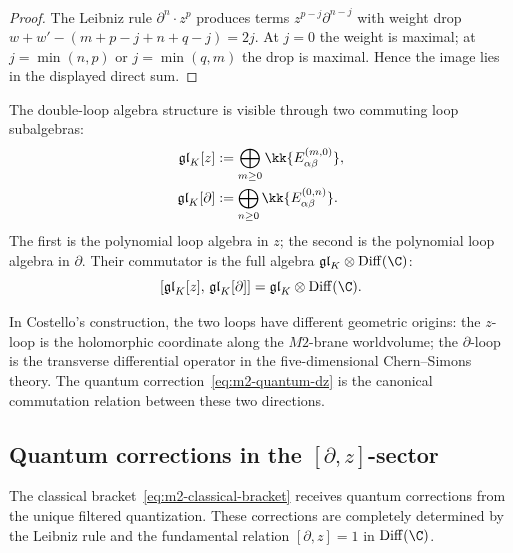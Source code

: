 \begin{proof}
The Leibniz rule $\partial^n\cdot z^p$
produces terms $z^{p-j}\partial^{n-j}$ with weight drop
$w+w'-(m+p-j+n+q-j)=2j$. At $j=0$ the weight is maximal;
at $j=\min(n,p)$ or $j=\min(q,m)$ the drop is maximal.
Hence the image lies in the displayed direct sum.
\end{proof}

\begin{definition}
The double-loop algebra structure is visible through two commuting
loop subalgebras:
\begin{align}
\mathfrak{gl}_K[z]
&:= \bigoplus_{m\ge 0}
\kk\{E^{(m,0)}_{\alpha\beta}\},
\\
\mathfrak{gl}_K[\partial]
&:= \bigoplus_{n\ge 0}
\kk\{E^{(0,n)}_{\alpha\beta}\}.
\end{align}
The first is the polynomial loop algebra in $z$; the second is the
polynomial loop algebra in $\partial$. Their commutator is the
full algebra $\mathfrak{gl}_K\otimes\Diff(\C)$:
\[
[\mathfrak{gl}_K[z],\,\mathfrak{gl}_K[\partial]]
= \mathfrak{gl}_K\otimes\Diff(\C).
\]
\end{definition}

\begin{remark}
In Costello's construction, the two loops have different geometric
origins: the $z$-loop is the holomorphic coordinate along the
$M2$-brane worldvolume; the $\partial$-loop is the transverse
differential operator in the five-dimensional Chern--Simons theory.
The quantum correction~\eqref{eq:m2-quantum-dz} is the canonical
commutation relation between these two directions.
\end{remark}


\subsection{Quantum corrections in the \texorpdfstring{$[\partial,z]$}{[d,z]}-sector}

The classical bracket~\eqref{eq:m2-classical-bracket} receives
quantum corrections from the unique filtered quantization. These
corrections are completely determined by the Leibniz rule and the
fundamental relation $[\partial,z]=1$ in $\Diff(\C)$.

